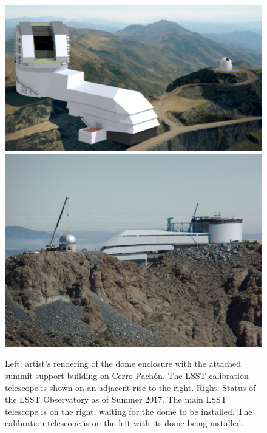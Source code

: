 \documentclass{emulateapj}
\begin{document}
\begin{figure}
\includegraphics[width=1.0\hsize,clip]{observatoryFull.pdf}
\includegraphics[width=1.0\hsize,clip]{ObservatoryFull_2017.pdf}
\caption{Left: artist's rendering of the dome enclosure 
with the attached summit support building on Cerro Pach\'{o}n. The LSST calibration 
telescope is shown on an adjacent rise to the right.
Right: Status of the LSST Observatory as of Summer 2017. The main LSST telescope is on the right, waiting for the dome to be installed. The calibration telescope is on the left with its dome being installed.} 
\label{Fig:observatory}
\end{figure}
\end{document}
